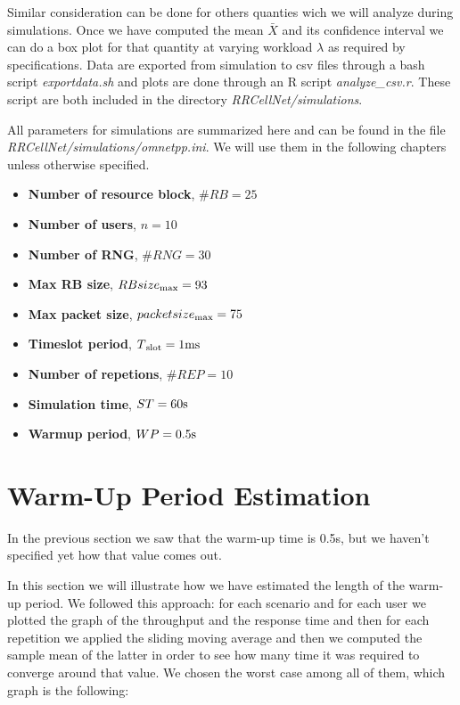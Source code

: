 Similar consideration can be done for others quanties wich we will analyze during simulations. Once we have computed the mean \(\bar{X}\) and its confidence interval we can do a box plot for that quantity at varying workload \(\lambda\) as required by specifications. Data are exported from simulation to csv files through a bash script \textit{exportdata.sh} and plots are done through an R script \textit{analyze\_csv.r}. These script are both included in the directory \textit{RRCellNet/simulations}.

All parameters for simulations are summarized here and can be found in the file \textit{RRCellNet/simulations/omnetpp.ini}. We will use them in the following chapters unless otherwise specified.
\begin{itemize}
\item \textbf{Number of resource block}, \(\#RB = 25\)
\item \textbf{Number of users}, \(n = 10\)
\item \textbf{Number of RNG}, \(\#RNG = 30\)
\item \textbf{Max RB size}, \(RBsize\textsubscript{max} = 93\)
\item \textbf{Max packet size}, \(packetsize\textsubscript{max} = 75\)
\item \textbf{Timeslot period}, \(T\textsubscript{slot} = 1\textnormal{ms}\)
\item \textbf{Number of repetions}, \(\#REP = 10\)
\item \textbf{Simulation time}, \(ST = 60 \textnormal{s}\)
\item \textbf{Warmup period}, \(WP = 0.5 \textnormal{s}\)
\end{itemize}

\section{Warm-Up Period Estimation}
In the previous section we saw that the warm-up time is 0.5s, but we haven't specified yet how that value comes out.

In this section we will illustrate how we have estimated the length of the warm-up period. We followed this approach: for each scenario and for each user we plotted the graph of the throughput and the response time and then for each repetition we applied the sliding moving average and then we computed the sample mean of the latter in order to see how many time it was required to converge around that value.
We chosen the worst case among all of them, which graph is the following:

